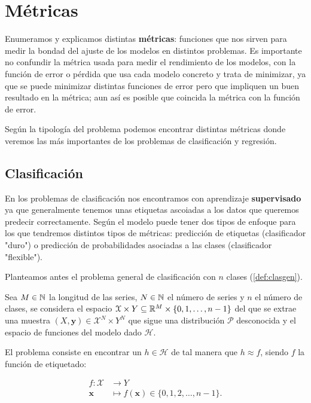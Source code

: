%

\chapter{Métricas}\label{ch:metricas}

Enumeramos y explicamos distintas \textbf{métricas}: funciones que nos sirven para medir la bondad del ajuste de los modelos en distintos problemas. Es importante no confundir la métrica usada para medir el rendimiento de los modelos, con la función de error o pérdida que usa cada modelo concreto y trata de minimizar, ya que se puede minimizar distintas funciones de error pero que impliquen un buen resultado en la métrica; aun así es posible que coincida la métrica con la función de error.

Según la tipología del problema podemos encontrar distintas métricas donde veremos las más importantes de los problemas de clasificación y regresión.

\section{Clasificación}

En los problemas de clasificación nos encontramos con aprendizaje \textbf{supervisado} ya que generalmente tenemos unas etiquetas ascoiadas a los datos que queremos predecir correctamente. Según el modelo puede tener dos tipos de enfoque para los que tendremos distintos tipos de métricas: predicción de etiquetas (clasificador "duro") o predicción de probabilidades asociadas a las clases (clasificador "flexible").

Planteamos antes el problema general de clasificación con $n$ clases (\autoref{def:clasgen}).

\begin{definicion}
  Sea $M \in \mathbb{N}$ la longitud de las series, $N \in \mathbb{N}$ el número de series y $n$ el número de clases, se considera el espacio $\mathcal{X} \times Y \subseteq \mathbb{R}^M \times \{0, 1, \ldots, n - 1\}$ del que se extrae una muestra $(X, \textbf{y}) \in \mathcal{X}^N \times Y^N$ que sigue una distribución $\mathcal{P}$ desconocida y el espacio de funciones del modelo dado $\mathcal{H}$.

  El problema consiste en encontrar un $h \in \mathcal{H}$ de tal manera que $h \approx f$, siendo $f$ la función de etiquetado:

  \begin{align*}
    f : \mathcal{X} & \to Y \\
    \textbf{x} & \mapsto f(\textbf{x}) \in \{0, 1, 2, \ldots, n - 1\}.
  \end{align*}
  \label{def:clasgen}
\end{definicion}

